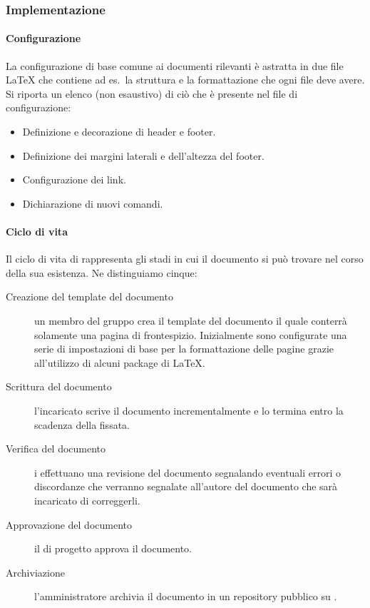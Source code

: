 \documentclass[../norme-di-progetto.tex]{subfiles}
\begin{document}
\subsubsection{Implementazione}%
\label{subs:implementazione}

\paragraph{Configurazione}%
\label{par:configurazione}
La configurazione di base comune ai documenti rilevanti è astratta in due file \LaTeX{} che contiene ad es.\ la struttura e la formattazione che ogni file deve avere.
Si riporta un elenco (non esaustivo) di ciò che è presente nel file di configurazione:

\begin{itemize}
  \item Definizione e decorazione di header e footer.
  \item Definizione dei margini laterali e dell'altezza del footer.
  \item Configurazione dei link.
  \item Dichiarazione di nuovi comandi.
\end{itemize}

\paragraph{Ciclo di vita}%
\label{par:ciclo_di_vita}
Il ciclo di vita di rappresenta gli stadi in cui il documento si può trovare nel corso della sua esistenza. Ne distinguiamo cinque:

\begin{description}
  \item [Creazione del template del documento] un membro del gruppo crea il template del documento il quale conterrà solamente una pagina di frontespizio. Inizialmente sono configurate una serie di impostazioni di base per la formattazione delle pagine grazie all'utilizzo di alcuni package di \LaTeX.
  \item [Scrittura del documento] l'incaricato scrive il documento incrementalmente e lo termina entro la scadenza della  fissata.
  \item [Verifica del documento] i  effettuano una revisione del documento segnalando eventuali errori o discordanze che verranno segnalate all'autore del documento che sarà incaricato di correggerli.
  \item [Approvazione del documento] il  di progetto approva il documento.
  \item [Archiviazione] l'amministratore archivia il documento in un repository pubblico su .
\end{description}
\end{document}
